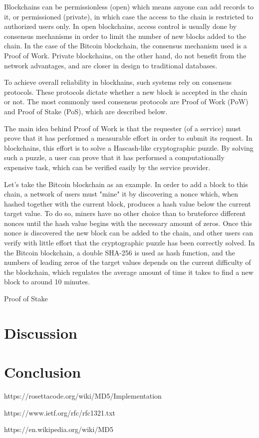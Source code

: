 \documentclass{article}
\begin{document}
\bigskip

Blockchains can be permissionless (open) which means anyone can add records to it, or permissioned (private), in which case the access to the chain is restricted to authorized users only. In open blockchains, access control is usually done by consensus mechanisms in order to limit the number of new blocks added to the chain. In the case of the Bitcoin blockchain, the consensus mechanism used is a Proof of Work.
Private blockchains, on the other hand, do not benefit from the network advantages, and are closer in design to traditional databases.

\bigskip

To achieve overall reliability in blockhains, such systems rely on consensus protocols. These protocols dictate whether a new block is accepted in the chain or not. The most commonly used consensus protocols are Proof of Work (PoW) and Proof of Stake (PoS), which are described below.

\bigskip

The main idea behind Proof of Work is that the requester (of a service) must prove that it has performed a measurable effort in order to submit its request. In blockchains, this effort is to solve a Hascash-like\cite{back2002hashcash} cryptographic puzzle. By solving such a puzzle, a user can prove that it has performed a computationally expensive task, which can be verified easily by the service provider.


Let's take the Bitcoin blockchain as an example. In order to add a block to this chain, a network of users must "mine" it by discovering a nonce which, when hashed together with the current block, produces a hash value below the current target value. To do so, miners have no other choice than to bruteforce different nonces until the hash value begins with the necessary amount of zeros. Once this nonce is discovered the new block can be added to the chain, and other users can verify with little effort that the cryptographic puzzle has been correctly solved. In the Bitcoin blockchain, a double SHA-256 is used as hash function, and the numbers of leading zeros of the target values depends on the current difficulty of the blockchain, which regulates the average amount of time it takes to find a new block to around 10 minutes.

\bigskip

Proof of Stake 


\section{Discussion}

\section{Conclusion}


\bigskip





https://rosettacode.org/wiki/MD5/Implementation

https://www.ietf.org/rfc/rfc1321.txt  

https://en.wikipedia.org/wiki/MD5  
\end{document}
